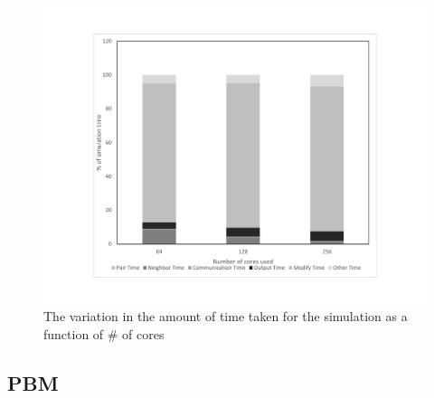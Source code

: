 \documentclass[preprint,11pt,authoryear]{elsarticle}
\begin{document}
\begin{figure}[H]
\centering
\includegraphics[scale=0.5]{rslts_DEM_percent_plot.pdf}
\caption{The variation in the amount of time taken for the simulation as a function of \# of cores}
\label{fig:rslts_DEM_percent_plot}
\end{figure}


\subsection{PBM}
\end{document}
